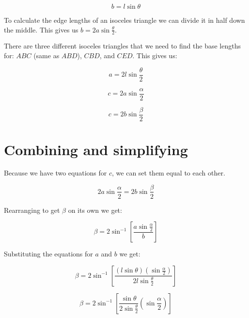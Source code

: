 \documentclass[a4paper]{article}
\begin{document}
  \begin{equation}
    b = l\sin{\theta}
  \end{equation}

  To calculate the edge lengths of an isoceles triangle we can divide it in half down the middle. This gives us $b = 2a\sin{\frac{\theta}{2}}$.

  There are three different isoceles triangles that we need to find the base lengths for: $ABC$ (same as $ABD$), $CBD$, and $CED$. This gives us:

  \begin{equation}
    a = 2l\sin{\frac{\theta}{2}}
  \end{equation}

  \begin{equation}
    c = 2a\sin{\frac{\alpha}{2}}
  \end{equation}

  \begin{equation}
    c = 2b\sin{\frac{\beta}{2}}
  \end{equation}

  \section{Combining and simplifying}

  Because we have two equations for $c$, we can set them equal to each other.

  \begin{equation}
    2a\sin{\frac{\alpha}{2}} = 2b\sin{\frac{\beta}{2}}
  \end{equation}

  Rearranging to get $\beta$ on its own we get:

  \begin{equation}
    \beta = 2\sin^{-1}{\left[\frac{a\sin{\frac{\alpha}{2}}}{b}\right]}
  \end{equation}

  Substituting the equations for $a$ and $b$ we get:

  \begin{equation}
    \beta = 2\sin^{-1}{\left[
      \frac{(l\sin{\theta})(\sin{\frac{\alpha}{2}})}
      {2l\sin{\frac{\theta}{2}}}
    \right]}
  \end{equation}

  \begin{equation}
    \beta = 2\sin^{-1}{\left[
      \frac{\sin{\theta}}{2\sin{\frac{\theta}{2}}}
      \left(\sin{\frac{\alpha}{2}}\right)
    \right]}
  \end{equation}
\end{document}

